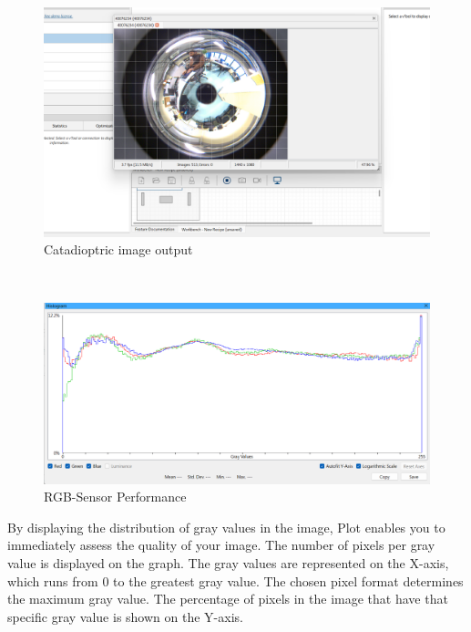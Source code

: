 \documentclass[11pt, a4paper, openany]{book}
\begin{document}
\begin{figure}[H]
    \centering
    \includegraphics[scale=0.5]{Labbot&ele/11.png}
    \caption{Catadioptric image output}
    \label{fig:output} 
\end{figure}\
\begin{figure}[H]
    \centering
    \includegraphics[scale=0.6]{Labbot&ele/12.png}
    \caption{RGB-Sensor Performance}
    \label{fig:RGB} 
\end{figure}
By displaying the distribution of gray values in the image, Plot enables you to immediately assess the quality of your image.\newline
The number of pixels per gray value is displayed on the graph.\newline
The gray values are represented on the X-axis, which runs from 0 to the greatest gray value. The chosen pixel format determines the maximum gray value.\newline
The percentage of pixels in the image that have that specific gray value is shown on the Y-axis.\newline
\end{document}
